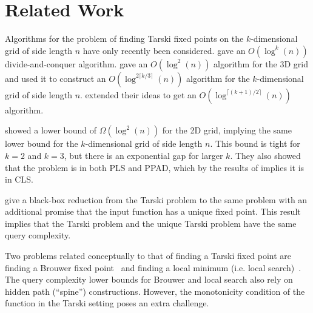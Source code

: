 \section{Related Work}
\label{sec:related_work}

Algorithms for the problem of finding Tarski fixed points on the $k$-dimensional grid of side length $n$ have only recently been considered. \cite{dang2020tarskialgorithm} gave an $O(\log^k (n))$ divide-and-conquer algorithm. \cite{fearnley2022faster} gave an $O(\log^2 (n))$ algorithm for the 3D grid and used it to construct an $O(\log^{2 \lceil k/3 \rceil} (n))$ algorithm for the $k$-dimensional grid of side length $n$. \cite{chen2022improved} extended their ideas to get an $O(\log^{\lceil (k+1)/2 \rceil}(n))$ algorithm.

 \cite{etessami2019tarski} showed a lower bound of $\Omega(\log^2(n))$ for the 2D grid, implying the same lower bound for the $k$-dimensional grid of side length $n$. This bound is tight for $k = 2$ and $k=3$, but there is an exponential gap for larger $k$. They also showed that the problem is in both PLS and PPAD, which by the results of \cite{fearnley2022cls} implies it is in CLS.

\cite{CLY23} give a black-box reduction from the Tarski problem to the same problem with an additional promise that the input function has a unique fixed point. This result  implies that the Tarski problem and the unique Tarski problem have the same query complexity.

Two problems related conceptually to that of finding a Tarski fixed point are finding a Brouwer fixed point~\cite{hirsch1989exponential,chen2005algorithms,chen2007paths} and finding a local minimum (i.e. local search)~\cite{aldous1983minimization,Aaronson06,zhang2009tight,llewellyn1989local,sun2009quantum,santha2004quantum,dinh2010quantum}. The query complexity lower bounds for Brouwer and local search also rely on hidden path (``spine'') constructions. However, the monotonicity condition of the function in the Tarski setting poses an extra challenge.